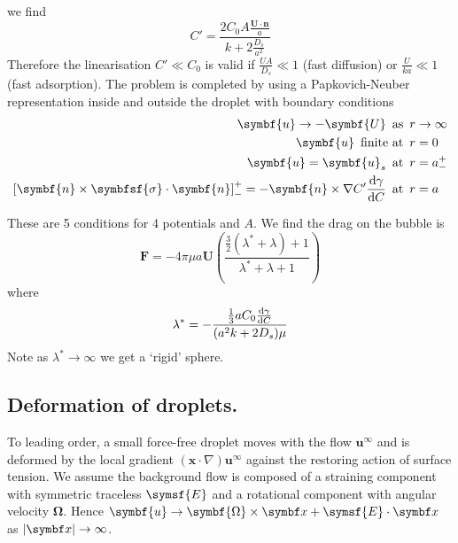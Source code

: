 \documentclass{jknotes}
\begin{document}
we find 
\begin{equation}
	C' = \frac{2C_0 A \frac{\symbf{U}\cdot\symbf{n}}{a}}{k + 2\frac{D_s}{a^2}}
\end{equation}
Therefore the linearisation $C' \ll C_0$ is valid if $\frac{UA}{D_s} \ll 1$
(fast diffusion) or $\frac{U}{ka} \ll 1$ (fast adsorption). The problem is
completed by using a Papkovich-Neuber representation inside and outside the
droplet with boundary conditions
\begin{align}
	\symbf{u} \to -\symbf{U} \,\,\, \text{as}\,\,\, &r \to \infty \\
	\symbf{u} \,\,\,\text{finite at} \,\,\, &r = 0 \\
	\symbf{u}= \symbf{u}_s \,\,\, \text{at} \,\,\, &r = a^+_-\\
	\left[\symbf{n} \times \symbfsf{\sigma}\cdot\symbf{n}\right]^+_- =
	-\symbf{n} \times \nabla C' \frac{\diffd \gamma}{\diffd C} \,\,\,
	\text{at} \,\,\, &r = a
\end{align}

These are 5 conditions for 4 potentials and $A$. We find the drag on the
bubble is
\begin{equation}
	\symbf{F} = -4\pi \mu a \symbf{U} \left(
	\frac{\frac{3}{2}(\lambda^*+\lambda)+1}{\lambda^*+\lambda+1}\right)
\end{equation}
where
\begin{equation}
	\lambda^* = -\frac{\frac{1}{3}a C_0 \frac{\diffd \gamma}{\diffd C}}{(a^2 k
	+ 2D_s)\mu}
\end{equation}
Note as $\lambda^* \to \infty$ we get a `rigid' sphere.

\subsection{Deformation of droplets.}
To leading order, a small force-free droplet moves with the flow
$\symbf{u}^\infty$ and is deformed by the local gradient
$(\symbf{x}\cdot\nabla)\symbf{u}^\infty$ against the restoring action of
surface tension. We assume the background flow is composed of a straining
component with symmetric traceless $\symsf{E}$ and a rotational component with
angular velocity $\symbf{\Omega}$. Hence $\symbf{u} \to \symbf{\Omega} \times
\x + \symsf{E}\cdot\x$ as $\abs{\x} \to \infty$.

\begin{center}
\end{center}
\end{document}
